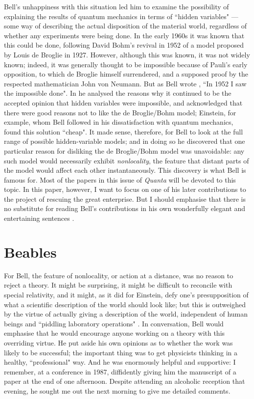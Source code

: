 \documentclass[12pt,a4paper,reqno]{article}
\renewcommand{\(}{\left(}
\renewcommand{\)}{\right)}
\renewcommand{\.}{\centerdot}
\newcommand{\1}{\mathbf{1}}
\newcommand{\<}{\langle}
\renewcommand{\>}{\rangle}
\theoremstyle{definition}
\theoremstyle{remark}
\numberwithin{equation}{section}
\begin{document}
Bell's unhappiness with this situation led him to examine the possibility of explaining the results of quantum mechanics in terms of ``hidden variables" --- some way of describing the actual disposition of the material world, regardless of whether any experiments were being done. In the early 1960s it was known that this could be done, following David Bohm's revival in 1952 of a model proposed by Louis de Broglie in 1927. However, although this was known, it was not widely known; indeed, it was generally thought to be impossible because of Pauli's early opposition, to which de Broglie himself surrendered, and a supposed proof by the respected mathematician John von Neumann. But as Bell wrote \cite{Bell:pilot}, ``In 1952 I saw the impossible done". In \cite{Bell:pilot} he analysed the reasons why it continued to be the accepted opinion that hidden variables were impossible, and acknowledged that there were good reasons not to like the de Broglie/Bohm model; Einstein, for example, whom Bell followed in his dissatisfaction with quantum mechanics, found this solution ``cheap". It made sense, therefore, for Bell to look at the full range of possible hidden-variable models; and in doing so he discovered that one particular reason for disliking the de Broglie/Bohm model was unavoidable: any such model would necessarily exhibit \emph{nonlocality}, the feature that distant parts of the model would affect each other instantaneously. This discovery is what Bell is famous for. Most of the papers in this issue of \emph{Quanta} will be devoted to this topic. In this paper, however, I want to focus on one of his later contributions to the project of rescuing the great enterprise. But I should emphasise that there is no substitute for reading Bell's contributions in his own wonderfully elegant and entertaining sentences \cite{Bell:book}.

\section{Beables}

For Bell, the feature of nonlocality, or action at a distance, was no reason to reject a theory. It might be surprising, it might be difficult to reconcile with special relativity, and it might, as it did for Einstein, defy one's presupposition of what a scientific description of the world should look like; but this is outweighed by the virtue of actually giving a description of the world, independent of human beings and ``piddling laboratory operations" \cite{Bell:piddling}. In conversation, Bell would emphasise that he would encourage anyone working on a theory with this overriding virtue. He put aside his own opinions as to whether the work was likely to be successful; the important thing was to get physicists thinking in a healthy, ``professional" \cite{Bell:beables} way. And he was enormously helpful and supportive: I remember, at a conference in 1987, diffidently giving him the manuscript of a paper at the end of one afternoon. Despite attending an alcoholic reception that evening, he sought me out the next morning to give me detailed comments.
\end{document}
